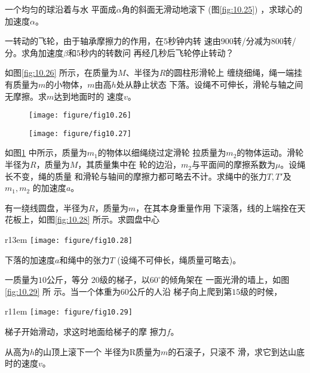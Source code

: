 \documentclass[../outline-of-mechanics.tex]{subfiles}
\begin{document}
\begin{exercises}
\exercise 一个均匀的球沿着与水
平面成$ \alpha $角的斜面无滑动地滚下
(图\ref{fig:10.25}) ，求球心的加速度$ \alpha $。

\exercise 一转动的飞轮，由于轴承摩擦力的作用，在$ 5 $秒钟内转
速由$ 900 $转/分减为$ 800 $转/分。求角加速度$ \beta $和$ 5 $秒内的转数问
再经几秒后飞轮停止转动？

\exercise 如图\ref{fig:10.26} 所示，在质量为$ M $、半径为$ R $的圆柱形滑轮上
缠绕细绳，绳一端挂有质量为$ m $的小物体，$ m $由高$ h $处从静止状态
下落。设绳不可伸长，滑轮与轴之间无摩擦。求$ m $达到地面时的
速度$ v $。
\begin{figure}[h]
  \begin{minipage}[b]{0.4\linewidth}
    \centering
    \texttt{[image: figure/fig10.26]}
    \caption{}
    \label{fig:10.26}
  \end{minipage}
  \begin{minipage}[b]{0.4\linewidth}
    \centering
    \texttt{[image: figure/fig10.27]}
    \caption{}
    \label{fig:10.27}
  \end{minipage}
\end{figure}

\exercise 如图\ref{fig:10.27} 中所示，质量为$ m _ { 1 } $的物体以细绳绕过定滑轮
拉质量为$ m _ { 2 } $的物体运动。滑轮半径为$ R $，质量为$ M $，其质量集中在
轮的边沿，$ m_2 $与平面间的摩擦系数为$ \mu $。设绳长不变，绳的质量
和滑轮与轴间的摩擦力都可略去不计。求绳中的张力$ T, T' $及$ m_1, m_2 $
的加速度$ a $。

\exercise 有一绕线圆盘，半径为$ R $，质量为$ m $，在其本身重量作用
下滚落，线的上端拴在天花板上，如图\ref{fig:10.28} 所示。求圆盘中心
\begin{wrapfigure}[8]{r}{13em}
  \centering
  \texttt{[image: figure/fig10.28]}
  \caption{}
  \label{fig:10.28}
\end{wrapfigure}
下落的加速度$ a $和绳中的张力$ T $
(设绳不可伸长，绳质量可略去)。

\exercise 一质量为$ 10 $公斤，等分
$ 20 $级的梯子，以$ 60^\circ $的倾角架在
一面光滑的墙上，如图\ref{fig:10.29} 所
示。当一个体重为$ 60 $公斤的人沿
梯子向上爬到第$ 15 $级的时候，

\clearpage\noindent
\begin{wrapfigure}[12]{r}{11em}
  \centering
  \texttt{[image: figure/fig10.29]}
  \caption{}
  \label{fig:10.29}
\end{wrapfigure}
梯子开始滑动，求这时地面给梯子的摩
擦力$ f $。

\exercise 从高为$ h $的山顶上滚下一个
半径为R质量为$ m $的石滚子，只滚不
滑，求它到达山底时的速度$ v $。


\end{exercises}
\end{document}

